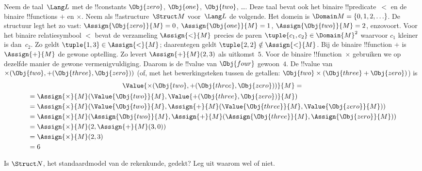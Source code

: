\documentclass[openany]{memoir}
\begin{document}
\begin{ex}
Neem de taal~$\Lang L$ met de !!{constant}s $\Obj{zero}$,
$\Obj{one}$, $\Obj{two}$, \dots. Deze taal bevat ook het binaire
!!{predicate}~$<$ en de binaire !!{function}s $+$ en $\times$.
Neem als !!a{structure}~$\Struct M$ voor~$\Lang L$ de volgende. Het
domein is $\Domain M = \{0, 1, 2, \ldots \}$. De structuur legt het zo
vast: $\Assign{\Obj{zero}}{M} = 0$, $\Assign{\Obj{one}}{M} = 1$,
$\Assign{\Obj{two}}{M} = 2$, enzovoort. Voor het binaire
relatiesymbool $<$ bevat de verzameling $\Assign{<}{M}$ precies de
paren $\tuple{c_1, c_2} \in \Domain{M}^2$ waarvoor $c_1$ kleiner is
dan~$c_2$. Zo geldt $\tuple{1, 3} \in \Assign{<}{M}$; daarentegen
geldt $\tuple{2, 2} \notin \Assign{<}{M}$. Bij de
binaire !!{function} $+$ is $\Assign{+}{M}$ de gewone optelling. Zo
levert $\Assign{+}{M}(2,3)$ als uitkomst~$5$. Voor de binaire
!!{function}~$\times$ gebruiken we op dezelfde manier de gewone
vermenigvuldiging. Daarom is de !!{value} van $\Obj{four}$ gewoon~$4$.
De !!{value} van $\times(\Obj{two},
+(\Obj{three},\Obj{zero}))$ (of, met het bewerkingsteken tussen de
getallen: $\Obj{two} \times (\Obj{three} + \Obj{zero})$) is
\begin{multline*}
\Value{\times(\Obj{two}, +(\Obj{three},\Obj{zero}))}{M} =\\
\begin{aligned}
& =\Assign{\times}{M}(\Value{\Obj{two}}{M}, \Value{+(\Obj{three}, \Obj{zero})}{M})\\
& = \Assign{\times}{M}(\Value{\Obj{two}}{M}, \Assign{+}{M}(\Value{\Obj{three}}{M},
\Value{\Obj{zero}}{M})) \\
& = \Assign{\times}{M}(\Assign{\Obj{two}}{M}, \Assign{+}{M}(\Assign{\Obj{three}}{M},
\Assign{\Obj{zero}}{M})) \\
& = \Assign{\times}{M}(2, \Assign{+}{M}(3, 0)) \\
& = \Assign{\times}{M}(2, 3) \\
& = 6
\end{aligned}
\end{multline*}
\end{ex}

\begin{prob}
Is $\Struct N$, het standaardmodel van de rekenkunde, gedekt? Leg uit
waarom wel of niet.
\end{prob}
\endgroup

\begingroup
\def\olfilename{OLP-0163}
\def\olfilepath{content/first-order-logic/syntax-and-semantics/}
\hypertarget{unit-OLP-0163}{}
\end{document}
